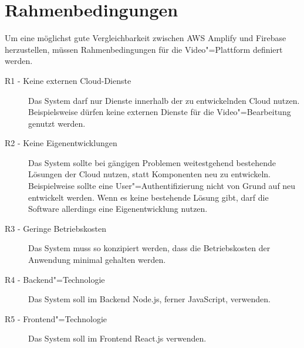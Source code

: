 \section{Rahmenbedingungen}

Um eine möglichst gute Vergleichbarkeit zwischen \ac{AWS} Amplify und Firebase herzustellen, müssen Rahmenbedingungen für die Video"=Plattform definiert werden.

\begin{description}
   \item[R1 - Keine externen Cloud-Dienste] Das System darf nur Dienste innerhalb der zu entwickelnden Cloud nutzen. Beispielsweise dürfen keine externen Dienste für die Video"=Bearbeitung genutzt werden.
   \item[R2 - Keine Eigenentwicklungen] Das System sollte bei gängigen Problemen weitestgehend bestehende Lösungen der Cloud nutzen, statt Komponenten neu zu entwickeln. Beispielweise sollte eine User"=Authentifizierung nicht von Grund auf neu entwickelt werden. Wenn es keine bestehende Lösung gibt, darf die Software allerdings eine Eigenentwicklung nutzen.
   \item[R3 - Geringe Betriebskosten] Das System muss so konzipiert werden, dass die Betriebskosten der Anwendung minimal gehalten werden.
   \item[R4 - Backend"=Technologie] Das System soll im Backend Node.js, ferner JavaScript, verwenden.
   \item[R5 - Frontend"=Technologie] Das System soll im Frontend React.js verwenden.
\end{description}